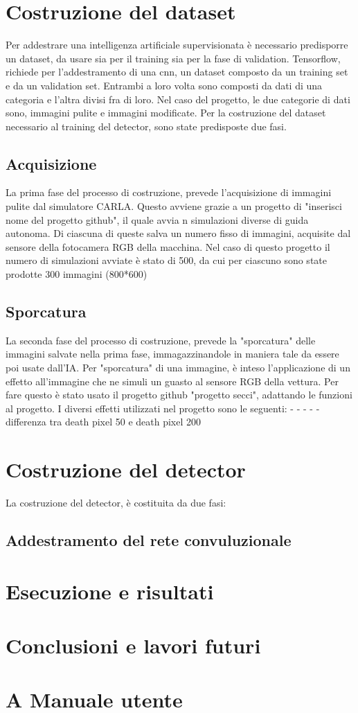 \documentclass[14pt]{extarticle}
\begin{document}
\section{Costruzione del dataset}
Per addestrare una intelligenza artificiale supervisionata è necessario predisporre un dataset, da usare sia per il training sia per la fase di validation.
Tensorflow, richiede per l'addestramento di una cnn, un dataset composto da un training set e da un validation set. Entrambi a loro volta sono composti da dati di una categoria e l'altra divisi fra di loro. Nel caso del progetto, le due categorie di dati sono, immagini pulite e immagini modificate.
Per la costruzione del dataset necessario al training del detector, sono state predisposte due fasi.


\subsection{Acquisizione}
La prima fase del processo di costruzione, prevede l'acquisizione di immagini pulite dal simulatore CARLA. Questo avviene grazie a un progetto di "inserisci nome del progetto github", il quale avvia n simulazioni diverse di guida autonoma. Di ciascuna di queste salva un numero fisso di immagini, acquisite dal sensore della fotocamera RGB della macchina.
Nel caso di questo progetto il numero di simulazioni avviate è stato di 500, da cui per ciascuno sono state prodotte 300 immagini (800*600)
\subsection{Sporcatura}
La seconda fase del processo di costruzione, prevede la "sporcatura" delle immagini salvate nella prima fase, immagazzinandole in maniera tale da essere poi usate dall'IA.
Per "sporcatura" di una immagine, è inteso l'applicazione di un effetto all'immagine che ne simuli un guasto al sensore RGB della vettura.
Per fare questo è stato usato il progetto github "progetto secci", adattando le funzioni al progetto.
I diversi effetti utilizzati nel progetto sono le seguenti:
-
-
-
-
-
differenza tra death pixel 50 e death pixel 200 

\section{Costruzione del detector}
La costruzione del detector, è costituita da due fasi:
\subsection{Addestramento del rete convuluzionale}




\section{Esecuzione e risultati}

\section{Conclusioni e lavori futuri}

\section{A Manuale utente}
\printindex
\end{document}

